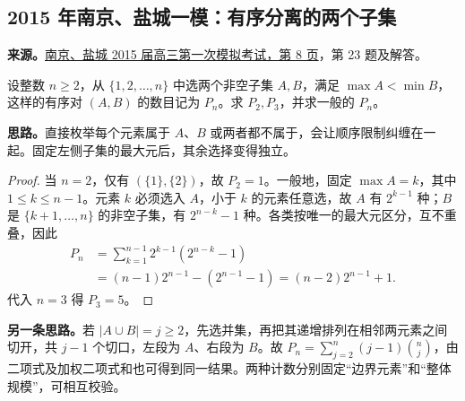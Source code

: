 \documentclass[UTF8]{ctexart}
\begin{document}
\subsection{2015 年南京、盐城一模：有序分离的两个子集}\label{sec:c2015ny1}
\textbf{来源。}\href{https://doc.xuehai.net/b440b636eecd6729ce54c837f-8.html}{南京、盐城 2015 届高三第一次模拟考试，第 8 页}，第 23 题及解答。
\begin{example}[题意]
设整数 $n\geq2$，从 $\{1,2,\ldots,n\}$ 中选两个非空子集 $A,B$，满足 $\max A<\min B$，这样的有序对 $(A,B)$ 的数目记为 $P_n$。求 $P_2,P_3$，并求一般的 $P_n$。
\end{example}
\textbf{思路。}直接枚举每个元素属于 $A$、$B$ 或两者都不属于，会让顺序限制纠缠在一起。固定左侧子集的最大元后，其余选择变得独立。
\begin{proof}
当 $n=2$，仅有 $(\{1\},\{2\})$，故 $P_2=1$。一般地，固定 $\max A=k$，其中 $1\leq k\leq n-1$。元素 $k$ 必须选入 $A$，小于 $k$ 的元素任意选，故 $A$ 有 $2^{k-1}$ 种；$B$ 是 $\{k+1,\ldots,n\}$ 的非空子集，有 $2^{n-k}-1$ 种。各类按唯一的最大元区分，互不重叠，因此
\begin{align*}
P_n&=\sum_{k=1}^{n-1}2^{k-1}(2^{n-k}-1)\\
&=(n-1)2^{n-1}-(2^{n-1}-1)
=\boxed{(n-2)2^{n-1}+1}.
\end{align*}
代入 $n=3$ 得 $P_3=5$。
\end{proof}
\textbf{另一条思路。}若 $|A\cup B|=j\geq2$，先选并集，再把其递增排列在相邻两元素之间切开，共 $j-1$ 个切口，左段为 $A$、右段为 $B$。故 $P_n=\sum_{j=2}^{n}(j-1)\binom nj$，由二项式及加权二项式和也可得到同一结果。两种计数分别固定“边界元素”和“整体规模”，可相互校验。
\end{document}
